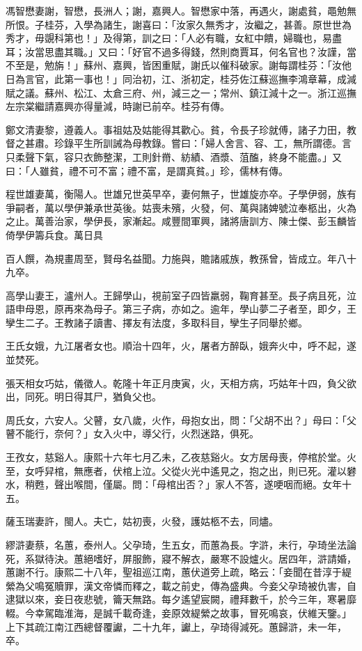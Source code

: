 \begin{pinyinscope}
馮智懋妻謝，智懋，長洲人；謝，嘉興人。智懋家中落，再遇火，謝處貧，黽勉無所恨。子桂芬，入學為諸生，謝喜曰：「汝家久無秀才，汝繼之，甚善。原世世為秀才，毋覬科第也！」及得第，訓之曰：「人必有職，女紅中饋，婦職也，易盡耳；汝當思盡其職。」又曰：「好官不過多得錢，然則商賈耳，何名官也？汝謹，當不至是，勉旃！」蘇州、嘉興，皆困重賦，謝氏以催科破家。謝每謂桂芬：「汝他日為言官，此第一事也！」同治初，江、浙初定，桂芬佐江蘇巡撫李鴻章幕，成減賦之議。蘇州、松江、太倉三府、州，減三之一；常州、鎮江減十之一。浙江巡撫左宗棠繼請嘉興亦得量減，時謝已前卒。桂芬有傳。

鄭文清妻黎，遵義人。事祖姑及姑能得其歡心。貧，令長子珍就傅，諸子力田，教督之甚肅。珍錄平生所訓誡為母教錄。嘗曰：「婦人舍言、容、工，無所謂德。言只柔聲下氣，容只衣飾整潔，工則針黹、紡績、酒漿、菹醢，終身不能盡。」又曰：「人雖貧，禮不可不富；禮不富，是謂真貧。」珍，儒林有傳。

程世雄妻萬，衡陽人。世雄兄世英早卒，妻何無子，世雄旋亦卒。子學伊弱，族有爭嗣者，萬以學伊兼承世英後。姑喪未殯，火發，何、萬與諸婢號泣奉柩出，火為之止。萬善治家，學伊長，家漸起。咸豐間軍興，諸將唐訓方、陳士傑、彭玉麟皆倚學伊籌兵食。萬日具

百人饌，為規畫周至，賢母名益聞。力施與，贍諸戚族，教孫曾，皆成立。年八十九卒。

高學山妻王，瀘州人。王歸學山，視前室子四皆羸弱，鞠育甚至。長子病且死，泣語申母恩，原再來為母子。第三子病，亦如之。逾年，學山夢二子者至，即夕，王孿生二子。王教諸子讀書、擇友有法度，多取科目，孿生子同舉於鄉。

王氏女娥，九江屠者女也。順治十四年，火，屠者方醉臥，娥奔火中，呼不起，遂並焚死。

張天相女巧姑，儀徵人。乾隆十年正月庚寅，火，天相方病，巧姑年十四，負父欲出，同死。明日得其尸，猶負父也。

周氏女，六安人。父瞽，女八歲，火作，母抱女出，問：「父胡不出？」母曰：「父瞽不能行，奈何？」女入火中，導父行，火烈迷路，俱死。

王孜女，慈谿人。康熙十六年七月乙未，乙夜慈谿火。女方居母喪，停棺於堂。火至，女呼舁棺，無應者，伏棺上泣。父從火光中遙見之，抱之出，則已死。灌以礬水，稍甦，聲出喉間，僅屬。問：「母棺出否？」家人不答，遂哽咽而絕。女年十五。

薩玉瑞妻許，閩人。夫亡，姑初喪，火發，護姑柩不去，同燼。

繆滸妻蔡，名蕙，泰州人。父孕琦，生五女，而蕙為長。字滸，未行，孕琦坐法論死，系獄待決。蕙絕嗜好，屏服飾，寢不解衣，嚴寒不設爐火。居四年，滸請婚，蕙謝不行。康熙二十八年，聖祖巡江南，蕙伏道旁上疏，略云：「妾聞在昔淳于緹縈為父鳴冤贖罪，漢文帝憐而釋之，載之前史，傳為盛典。今妾父孕琦被仇害，自逮獄以來，妾日夜悲號，籥天無路。每夕遙望宸闕，禮拜數千，於今三年，寒暑靡輟。今幸駕臨淮海，是誠千載奇逢，妾原效緹縈之故事，冒死鳴哀，伏維天鑒。」上下其疏江南江西總督覆讞，二十九年，讞上，孕琦得減死。蕙歸滸，未一年，卒。


\end{pinyinscope}
